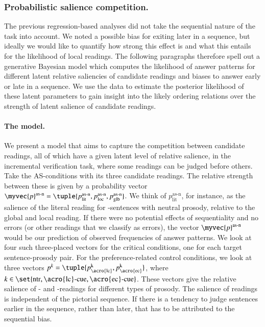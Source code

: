 \documentclass[fleqn,reqno,10pt]{article}
\newcommand{\as}{\acro{as}}
\newcommand{\lc}{\acro{lc}}
\newcommand{\ec}{\acro{ec}}
\begin{document}
\subsubsection{Probabilistic salience competition.} 

The previous regression-based analyses did not take the sequential
nature of the task into account. We noted a possible bias for exiting
later in a sequence, but ideally we would like to quantify how strong
this effect is and what this entails for the likelihood of local
readings. The following paragraphs therefore spell out a generative
Bayesian model which computes the likelihood of answer patterns for
different latent relative saliencies of candidate readings and biases
to answer early or late in a sequence. We use the data to estimate the
posterior likelihood of these latent parameters to gain insight into
the likely ordering relations over the strength of latent salience of
candidate readings.

\paragraph{The model.} We present a model that aims to capture the
competition between candidate readings, all of which have a given
latent level of relative salience, in the incremental verification
task, where some readings can be judged before others. Take the
AS-conditions with its three candidate readings. The relative strength
between these is given by a probability vector $\myvec{p}^\text{as-n}
=
\tuple{p^\text{as-n}_{\text{lit}},p^\text{as-n}_{\text{loc}},p^\text{as-n}_{\text{glb}}}$. We
think of $p^\text{as-n}_{\text{lit}}$, for instance, as the salience
of the literal reading for \as-sentences with neutral prosody,
relative to the global and local reading. If there were no potential
effects of sequentiality and no errors (or other readings that we
classify as errors), the vector $\myvec{p}^\text{as-n}$ would be our
prediction of observed frequencies of answer patterns. We look at four
such three-placed vectors for the critical conditions, one for each
target sentence-prosody pair. For the preference-related control
conditions, we look at three vectors $p^k =
\tuple{p^{\text{k}}_{\text{\lc}}, p^{\text{k}}_{\text{\ec}}}$, where
$k \in \set{\text{ntr}, \text{\lc-cue}, \text{\ec-cue}}$. These
vectors give the relative salience of \lc- and \ec-readings for
different types of prosody. The salience of readings is independent
of the pictorial sequence. If there is a tendency to judge sentences
earlier in the sequence, rather than later, that has to be attributed
to the sequential bias.
\end{document}
